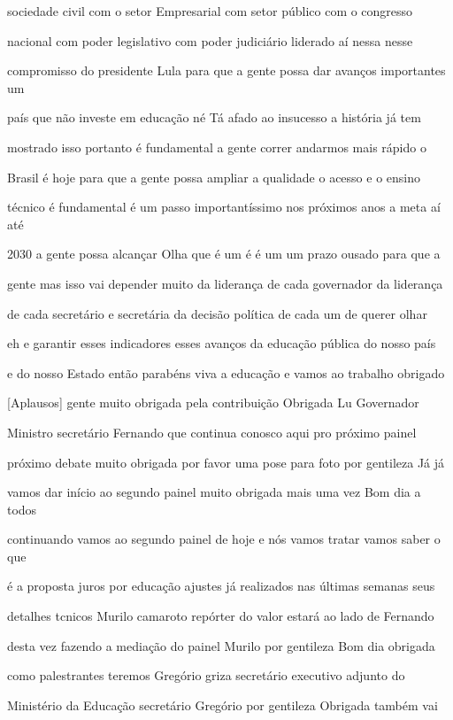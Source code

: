 \documentclass[a4paper,12pt]{article}
\begin{document}
sociedade civil com o setor Empresarial com setor público com o congresso

nacional com poder legislativo com poder judiciário liderado aí nessa nesse

compromisso do presidente Lula para que a gente possa dar avanços importantes um

país que não investe em educação né Tá afado ao insucesso a história já tem

mostrado isso portanto é fundamental a gente correr andarmos mais rápido o

Brasil é hoje para que a gente possa ampliar a qualidade o acesso e o ensino

técnico é fundamental é um passo importantíssimo nos próximos anos a meta aí até

2030 a gente possa alcançar Olha que é um é é um um prazo ousado para que a

gente mas isso vai depender muito da liderança de cada governador da liderança

de cada secretário e secretária da decisão política de cada um de querer olhar

eh e garantir esses indicadores esses avanços da educação pública do nosso país

e do nosso Estado então parabéns viva a educação e vamos ao trabalho obrigado

[Aplausos] gente muito obrigada pela contribuição Obrigada Lu Governador

Ministro secretário Fernando que continua conosco aqui pro próximo painel

próximo debate muito obrigada por favor uma pose para foto por gentileza Já já

vamos dar início ao segundo painel muito obrigada mais uma vez Bom dia a todos

continuando vamos ao segundo painel de hoje e nós vamos tratar vamos saber o que

é a proposta juros por educação ajustes já realizados nas últimas semanas seus

detalhes tcnicos Murilo camaroto repórter do valor estará ao lado de Fernando

desta vez fazendo a mediação do painel Murilo por gentileza Bom dia obrigada

como palestrantes teremos Gregório griza secretário executivo adjunto do

Ministério da Educação secretário Gregório por gentileza Obrigada também vai
\end{document}
